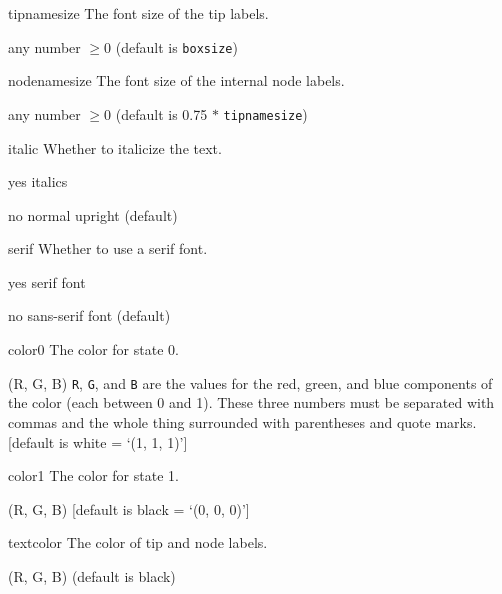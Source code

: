 \documentclass[10pt]{article}
\begin{document}
\begin{optdescrip}
	\item[tipnamesize] The font size of the tip labels.
		\begin{valdescrip}
			\item[]  any number $\ge 0$ (default is \texttt{boxsize})
		\end{valdescrip}

	\item[nodenamesize] The font size of the internal node labels.
		\begin{valdescrip}
			\item[]  any number $\ge 0$ (default is 0.75 $*$ \texttt{tipnamesize})
		\end{valdescrip}

	\item[italic] Whether to italicize the text.
		\begin{valdescrip}
			\item[yes] italics
			\item[no] normal upright (default)
		\end{valdescrip}

	\item[serif] Whether to use a serif font.
		\begin{valdescrip}
			\item[yes] serif font
			\item[no] sans-serif font (default)
		\end{valdescrip}

	\item[color0] The color for state 0.
		\begin{valdescrip}
		\item[(R, G, B)] \texttt{R}, \texttt{G}, and \texttt{B} are the values for the red, green, and blue components of the color (each between 0 and 1).  These three numbers must be separated with commas and the whole thing surrounded with parentheses and quote marks.  [default is white = `(1, 1, 1)']
		\end{valdescrip}

	\item[color1] The color for state 1.
		\begin{valdescrip}
			\item[(R, G, B)] [default is black = `(0, 0, 0)']
		\end{valdescrip}

	\item[textcolor] The color of tip and node labels.
		\begin{valdescrip}
			\item[(R, G, B)] (default is black)
		\end{valdescrip}


\end{optdescrip}
\end{document}
